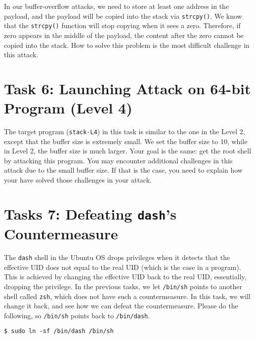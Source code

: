 In our buffer-overflow attacks, we need to store at least one address
in the payload, and the payload will be copied into the stack via
\texttt{strcpy()}. We know that the \texttt{strcpy()} function
will stop copying when it sees a zero. Therefore, if zero
appears in the middle of the payload, the content after the
zero cannot be copied into the stack. How to solve this
problem is the most difficult challenge in this attack.




\section{Task 6: Launching Attack on 64-bit Program (Level 4)}


The target program (\texttt{stack-L4}) in this task is similar to the one in the Level 2,
except that the buffer size is extremely small. We set the 
buffer size to 10, while in Level 2, the buffer size is much larger. 
Your goal is the same: get the root shell by attacking this \setuid program. 
You may encounter additional challenges in this attack 
due to the small buffer size. 
If that is the case, you need to explain how your have solved 
those challenges in your attack. 



\section{Tasks 7: Defeating \texttt{dash}'s Countermeasure}

The \texttt{dash} shell in the Ubuntu OS 
drops privileges when it detects that the effective UID does not 
equal to the real UID (which is the case in a \setuid program). 
This is achieved by changing the 
effective UID back to the real UID, essentially, dropping the 
privilege.  In the previous tasks, we let \texttt{/bin/sh} points
to another shell called \texttt{zsh}, which does not have such
a countermeasure. In this task, we will change it back, 
and see how we can defeat the countermeasure. Please 
do the following, so \texttt{/bin/sh} points back to 
\texttt{/bin/dash}. 


\begin{lstlisting}
$ sudo ln -sf /bin/dash /bin/sh
\end{lstlisting}

